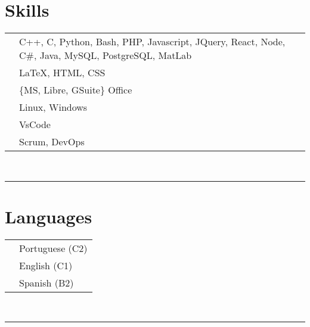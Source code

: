 \documentclass[oneside]{article}
\begin{document}
{\begin{minipage}[t][\textheight-2\fboxsep-2\fboxrule][t]{\dimexpr0.40\textwidth-2\fboxrule-2\fboxsep\relax}
        \section*{\large Skills}
        \begin{tabularx}{\textwidth}{cY}
            \faCode{}        & C++, C, Python, Bash, PHP, Javascript, JQuery, React, Node, C\#, Java, MySQL, PostgreSQL, MatLab \\
            \faPen*{}        & \LaTeX, HTML, CSS \\
            \faFont{}        & \{MS, Libre, GSuite\} Office \\
            \faCogs{}        & Linux, Windows \\
            \faLaptopCode{}  & VsCode \\
            \faToolbox{}     & Scrum, DevOps
        \end{tabularx}
        \vspace{1pt} \\
        \rule{\linewidth}{0.4pt}
        \section*{\large Languages}
        \begin{tabular}{cl}
            \faLanguage{} & Portuguese (C2) \\
            \faLanguage{} & English (C1) \\
            \faLanguage{} & Spanish (B2) 
        \end{tabular}
        \vspace{.3cm}
        \\ 
        \rule{\linewidth}{0.4pt}
        \\

    \end{minipage}
}
\hfill
\end{document}
